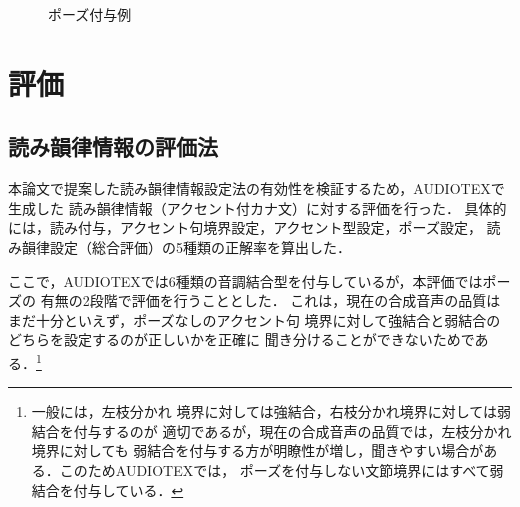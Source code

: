 \begin{figure}[tb]
\vspace{-4mm}
\begin{center}
\end{center}
\caption{ポーズ付与例}
\label{fig:pause}
\end{figure}

\section{評価}\label{sec:evaluation}
\subsection{読み韻律情報の評価法}\label{subs:kana}
本論文で提案した読み韻律情報設定法の有効性を検証するため，AUDIOTEXで生成した
読み韻律情報（アクセント付カナ文）に対する評価を行った．
具体的には，読み付与，アクセント句境界設定，アクセント型設定，ポーズ設定，
読み韻律設定（総合評価）の5種類の正解率を算出した．

ここで，AUDIOTEXでは6種類の音調結合型を付与しているが，本評価ではポーズの
有無の2段階で評価を行うこととした．
これは，現在の合成音声の品質はまだ十分といえず，ポーズなしのアクセント句
境界に対して強結合と弱結合のどちらを設定するのが正しいかを正確に
聞き分けることができないためである．\footnote{一般には，左枝分かれ
境界に対しては強結合，右枝分かれ境界に対しては弱結合を付与するのが
適切であるが，現在の合成音声の品質では，左枝分かれ境界に対しても
弱結合を付与する方が明瞭性が増し，聞きやすい場合がある．このためAUDIOTEXでは，
ポーズを付与しない文節境界にはすべて弱結合を付与している．}

